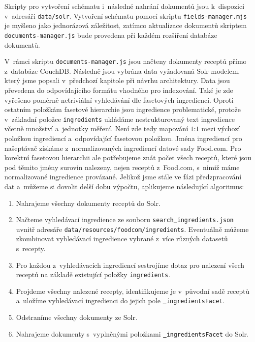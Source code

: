 Skripty pro vytvoření schématu i~následné nahrání dokumentů jsou k~dispozici v~adresáři \texttt{data/solr}. Vytvoření schématu pomocí skriptu \texttt{fields-manager.mjs} je myšleno jako jednorázová záležitost, zatímco aktualizace dokumentů skriptem \texttt{documents-manager.js} bude provedena při každém rozšíření databáze dokumentů.

V~rámci skriptu \texttt{documents-manager.js} jsou načteny dokumenty receptů přímo z~databáze CouchDB. Následně jsou vybrána data vyžadovaná Solr modelem, který jsme popsali v~předchozí kapitole při návrhu architektury. Data jsou převedena do odpovídajícího formátu vhodného pro indexování. Také je zde vyřešeno poměrně netriviální vyhledávání dle fasetových ingrediencí. Oproti ostatním položkám fasetové hierarchie jsou ingredience problematické, protože v~základní položce \texttt{ingredients} ukládáme nestrukturovaný text ingredience včetně množství a~jednotky měření. Není zde tedy mapování $1$:$1$ mezi výchozí položkou ingrediencí a~odpovídající fasetovou položkou. Jména ingrediencí pro našeptávač získáme z~normalizovaných ingrediencí datové sady Food.com. Pro korektní fasetovou hierarchii ale potřebujeme znát počet všech receptů, které jsou pod těmito jmény surovin nalezeny, nejen receptů z~Food.com, s~nimiž máme normalizované ingredience provázané. Jelikož jsme stále ve fázi předzpracování dat a~můžeme si dovolit delší dobu výpočtu, aplikujeme následující algoritmus:
\begin{enumerate}
    \item Nahrajeme všechny dokumenty receptů do Solr.
    \item Načteme vyhledávací ingredience ze souboru \texttt{search\underline{{ }}ingredients.json} uvnitř adresáře \texttt{data/resources/foodcom/ingredients}. Eventuálně můžeme zkombinovat vyhledávací ingredience vybrané z~více různých datasetů s~recepty.
    \item Pro každou z~vyhledávacích ingrediencí sestrojíme dotaz pro nalezení všech receptů na základě existující položky \texttt{ingredients}.
    \item Projdeme všechny nalezené recepty, identifikujeme je v~původní sadě receptů a~uložíme vyhledávací ingredienci do jejich pole \texttt{\underline{{ }}ingredientsFacet}.
    \item Odstraníme všechny dokumenty ze Solr.
    \item Nahrajeme dokumenty s~vyplněnými položkami \texttt{\underline{{ }}ingredientsFacet} do Solr.
\end{enumerate}


